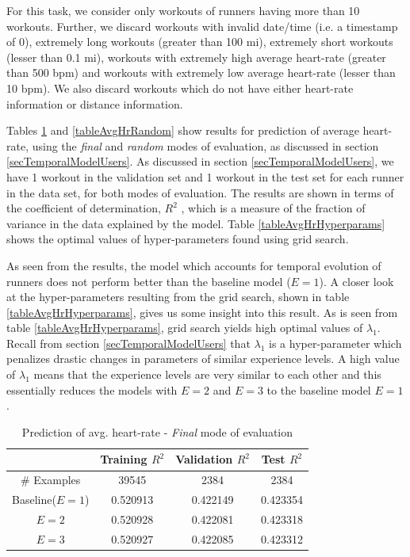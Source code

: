 \documentclass{acm_proc_article-sp}
\begin{document}
For this task, we consider only workouts of runners having more than 10 workouts. Further, we discard workouts with invalid date/time (i.e. a timestamp of 0), extremely long workouts (greater than 100 mi), extremely short workouts (lesser than 0.1 mi), workouts with extremely high average heart-rate (greater than 500 bpm) and workouts with extremely low average heart-rate (lesser than 10 bpm). We also discard workouts which do not have either heart-rate information or distance information.

Tables \ref{tableAvgHrFinal} and \ref{tableAvgHrRandom} show results for prediction of average heart-rate, using the  \emph{final} and \emph{random} modes of evaluation, as discussed in section \ref{secTemporalModelUsers}. As discussed in section \ref{secTemporalModelUsers}, we have 1 workout in the validation set and 1 workout in the test set for each runner in the data set, for both modes of evaluation. The results are shown in terms of the coefficient of determination, $R^2$ \cite{r2Wiki}, which is a measure of the fraction of variance in the data explained by the model. Table \ref{tableAvgHrHyperparams} shows the optimal values of hyper-parameters found using grid search.

As seen from the results, the model which accounts for temporal evolution of runners does not perform better than the baseline model ($E = 1$). A closer look at the hyper-parameters resulting from the grid search, shown in table \ref{tableAvgHrHyperparams}, gives us some insight into this result. As is seen from table \ref{tableAvgHrHyperparams}, grid search yields high optimal values of $\lambda_1$. Recall from section \ref{secTemporalModelUsers} that $\lambda_1$ is a hyper-parameter which penalizes drastic changes in parameters of similar experience levels. A high value of $\lambda_1$ means that the experience levels are very similar to each other and this essentially reduces the models with $E = 2$ and $E = 3$ to the baseline model $E = 1$.

\begin{table}[h]
\centering
\begin{tabular}{|c|c|c|c|} \hline
& Training $R^2$ & Validation $R^2$ & Test $R^2$ \\ \hline
\# Examples & 39545 & 2384 & 2384  \\ \hline
Baseline($E = 1$)& 0.520913 & 0.422149 & 0.423354  \\ \hline
$E = 2$ & 0.520928 & 0.422081 & 0.423318 \\ \hline
$E = 3$ & 0.520927 & 0.422085 & 0.423312 \\ \hline
\end{tabular}
\caption{Prediction of avg. heart-rate - \emph{Final} mode of evaluation }
\label{tableAvgHrFinal}
\end{table}
\end{document}
